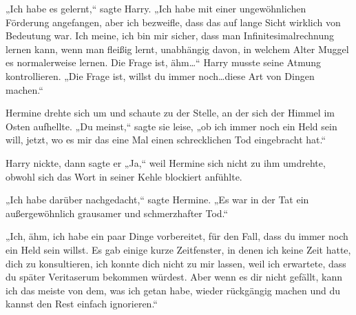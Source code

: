 „Ich habe es gelernt,“ sagte Harry. „Ich habe mit einer ungewöhnlichen Förderung angefangen, aber ich bezweifle, dass das auf lange Sicht wirklich von Bedeutung war. Ich meine, ich bin mir sicher, dass man Infinitesimalrechnung lernen kann, wenn man fleißig lernt, unabhängig davon, in welchem Alter Muggel es normalerweise lernen. Die Frage ist, ähm…“ Harry musste seine Atmung kontrollieren. „Die Frage ist, willst du immer noch…diese Art von Dingen machen.“

Hermine drehte sich um und schaute zu der Stelle, an der sich der Himmel im Osten aufhellte. „Du meinst,“ sagte sie leise, „ob ich immer noch ein Held sein will, jetzt, wo es mir das eine Mal einen schrecklichen Tod eingebracht hat.“

Harry nickte, dann sagte er „Ja,“ weil Hermine sich nicht zu ihm umdrehte, obwohl sich das Wort in seiner Kehle blockiert anfühlte.

„Ich habe darüber nachgedacht,“ sagte Hermine. „Es war in der Tat ein außergewöhnlich grausamer und schmerzhafter Tod.“

„Ich, ähm, ich habe ein paar Dinge vorbereitet, für den Fall, dass du immer noch ein Held sein willst. Es gab einige kurze Zeitfenster, in denen ich keine Zeit hatte, dich zu konsultieren, ich konnte dich nicht zu mir lassen, weil ich erwartete, dass du später Veritaserum bekommen würdest. Aber wenn es dir nicht gefällt, kann ich das meiste von dem, was ich getan habe, wieder rückgängig machen und du kannst den Rest einfach ignorieren.“

